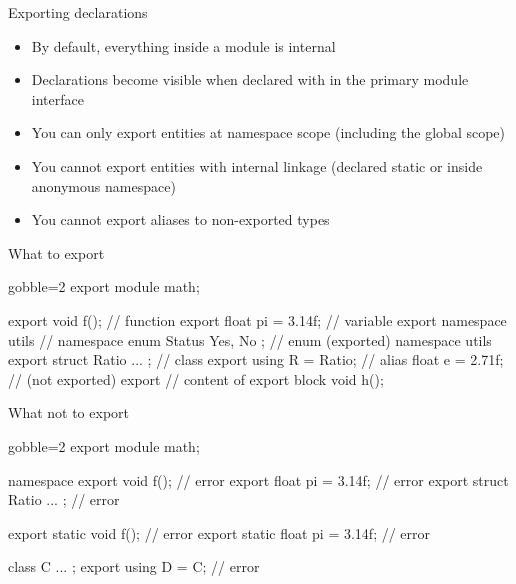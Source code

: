 \begin{frame}[fragile]
  \begin{block}{Exporting declarations}
    \begin{itemize}
      \item By default, everything inside a module is internal
      \item Declarations become visible when declared with  in the primary module interface
      \item You can only export entities at namespace scope (including the global scope)
      \item You cannot export entities with internal linkage (declared static or inside anonymous namespace)
      \item You cannot export aliases to non-exported types
    \end{itemize}
  \end{block}
\end{frame}

\begin{frame}[fragile]
  \begin{exampleblock}{What to export}
    \begin{cppcode*}{gobble=2}
      export module math;

      export void f();           // function
      export float pi = 3.14f;   // variable
      export namespace utils {   // namespace
        enum Status { Yes, No }; // enum (exported)
      }
      namespace utils {
        export struct Ratio { ... }; // class
        export using R = Ratio;      // alias
        float e = 2.71f;             // (not exported)
      }
      export { // content of export block
        void h();
      }
    \end{cppcode*}
  \end{exampleblock}
\end{frame}

\begin{frame}[fragile]
  \begin{alertblock}{What not to export}
    \begin{cppcode*}{gobble=2}
      export module math;

      namespace {
        export void f();              // error
        export float pi = 3.14f;      // error
        export struct Ratio { ... };  // error
      }

      export static void f();         // error
      export static float pi = 3.14f; // error

      class C { ... };
      export using D = C;             // error
    \end{cppcode*}
  \end{alertblock}
\end{frame}

